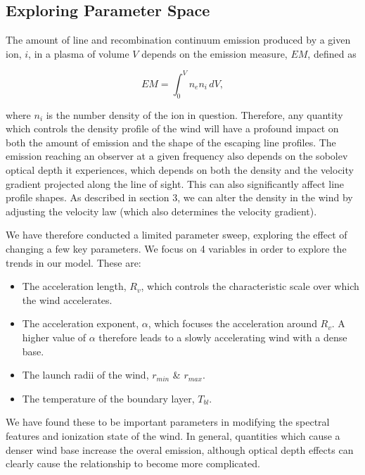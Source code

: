 \documentclass[preprint, a4paper, 11pt]{aastex}
\begin{document}
\subsection{Exploring Parameter Space}

The amount of line and recombination continuum
emission produced by a given ion, $i$, in a plasma of volume $V$
depends on the emission measure, $EM$, defined as

\begin{equation}
EM=\int^V_0 n_e n_i \,dV,
\end{equation}


where $n_i$ is the number density of the ion in question.    
Therefore, any quantity which controls the density profile of the wind
will have a profound impact on both the 
amount of emission and the shape of the escaping line profiles.
The emission reaching an observer at a given frequency
also depends on the sobolev optical depth it experiences, which depends on both
the density and the velocity gradient projected
along the line of sight. This can also significantly affect line profile shapes.       
As described in section 3, we can alter the density in the wind by 
adjusting the velocity law (which also determines the velocity gradient). 

We have therefore conducted a limited parameter 
sweep, exploring the effect of changing a few key parameters.  We focus on 
4 variables in order to explore the trends in our model. These are:

\begin{itemize}
 	\item  The acceleration length, $R_v$, which controls the characteristic scale
 	over which the wind accelerates.
 	\item The acceleration exponent, $\alpha$, which focuses the acceleration
 	around $R_v$. A higher value of $\alpha$ therefore leads to a slowly accelerating 
 	wind with a dense base.
 	\item The launch radii of the wind, $r_{min}$ \& $r_{max}$.
 	\item The temperature of the boundary layer, $T_{bl}$.
 \end{itemize} 

We have found these to be important parameters in modifying 
the spectral features and ionization state of the wind.
In general, quantities which cause a denser wind base increase
the overal emission, although optical depth effects can clearly cause 
the relationship to become more complicated. 
\end{document}

